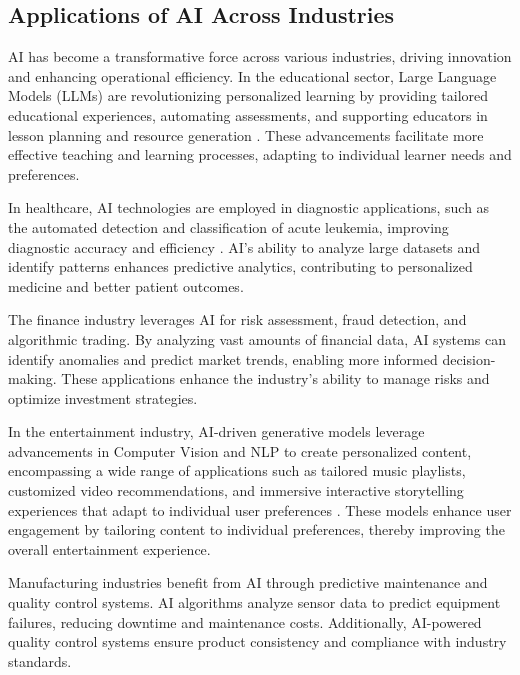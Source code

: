 \subsection{Applications of AI Across Industries} \label{subsec:Applications of AI Across Industries}

AI has become a transformative force across various industries, driving innovation and enhancing operational efficiency. In the educational sector, Large Language Models (LLMs) are revolutionizing personalized learning by providing tailored educational experiences, automating assessments, and supporting educators in lesson planning and resource generation \cite{kasneci2023chatgpt}. These advancements facilitate more effective teaching and learning processes, adapting to individual learner needs and preferences.

In healthcare, AI technologies are employed in diagnostic applications, such as the automated detection and classification of acute leukemia, improving diagnostic accuracy and efficiency \cite{zolfaghari2023surveyautomateddetectionclassification}. AI's ability to analyze large datasets and identify patterns enhances predictive analytics, contributing to personalized medicine and better patient outcomes.

The finance industry leverages AI for risk assessment, fraud detection, and algorithmic trading. By analyzing vast amounts of financial data, AI systems can identify anomalies and predict market trends, enabling more informed decision-making. These applications enhance the industry's ability to manage risks and optimize investment strategies.

In the entertainment industry, AI-driven generative models leverage advancements in Computer Vision and NLP to create personalized content, encompassing a wide range of applications such as tailored music playlists, customized video recommendations, and immersive interactive storytelling experiences that adapt to individual user preferences \cite{palmini2024patternscreativityuserinput}. These models enhance user engagement by tailoring content to individual preferences, thereby improving the overall entertainment experience.

Manufacturing industries benefit from AI through predictive maintenance and quality control systems. AI algorithms analyze sensor data to predict equipment failures, reducing downtime and maintenance costs. Additionally, AI-powered quality control systems ensure product consistency and compliance with industry standards.

